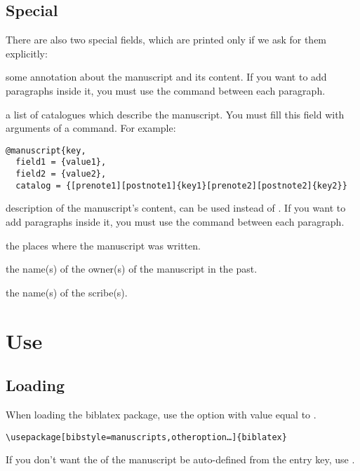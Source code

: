 \documentclass{ltxdockit}[2011/03/25]
\newcommand{\biblatex}{biblatex\xspace}
\begin{document}
\subsection{Special}\label{fields:special}
There are also two special fields, which are printed only if we ask for them explicitly:

\begin{fieldlist}
 some annotation about the manuscript and its content. If you want to add paragraphs inside it, you must use the  command between each paragraph.


 a list of catalogues which describe the manuscript. You must fill this field with arguments of a  command. For example:

\begin{verbatim}
@manuscript{key,
  field1 = {value1},
  field2 = {value2},
  catalog = {[prenote1][postnote1]{key1}[prenote2][postnote2]{key2}}
\end{verbatim}

 description of the manuscript's content, can be used instead of . If you want to add paragraphs inside it, you must use the  command between each paragraph.

 the places where the manuscript was written.

 the name(s) of the owner(s) of the manuscript in the past.

 the name(s) of the scribe(s).

\end{fieldlist}

\section{Use}
\subsection{Loading}

When loading the \biblatex package, use the option  with value equal to .

\begin{verbatim}
\usepackage[bibstyle=manuscripts,otheroption…]{biblatex}
\end{verbatim}

\label{noautoshorthand}If you don't want the  of the manuscript be auto-defined from the entry key, use .
\end{document}

